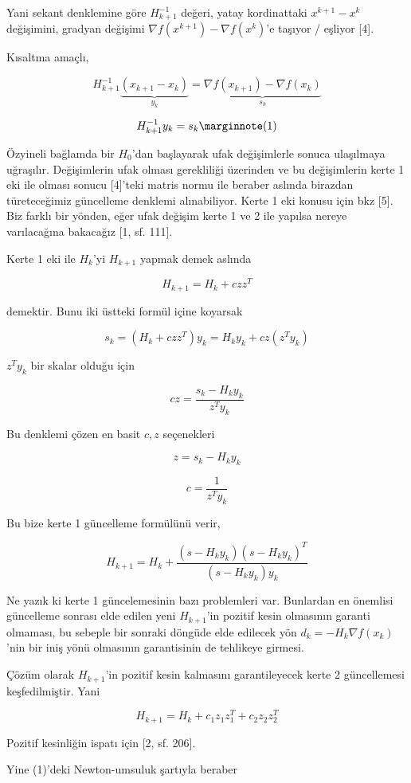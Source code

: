 \documentclass[12pt,fleqn]{article}\usepackage{../../common}
\begin{document}
Yani sekant denklemine göre $H_{k+1}^{-1}$ değeri, yatay kordinattaki
$x^{k+1}-x^k$ değişimini, gradyan değişimi $\nabla f(x^{k+1}) - \nabla
f(x^k)$'e taşıyor / eşliyor [4].

Kısaltma amaçlı,

$$
H_{k+1}^{-1} \underbrace{(x_{k+1}-x_k)}_{y_k} = 
\underbrace{\nabla f(x_{k+1}) - \nabla f(x_k)}_{s_k}
$$

$$
H_{k+1}^{-1} y_k = s_k
\mlabel{1}
$$

Özyineli bağlamda bir $H_0$'dan başlayarak ufak değişimlerle sonuca
ulaşılmaya uğraşılır. Değişimlerin ufak olması gerekliliği üzerinden ve bu
değişimlerin kerte 1 eki ile olması sonucu [4]'teki matris normu ile
beraber aslında birazdan türeteceğimiz güncelleme denklemi
alınabiliyor. Kerte 1 eki konusu için bkz [5]. Biz farklı bir yönden, eğer
ufak değişim kerte 1 ve 2 ile yapılsa nereye varılacağına bakacağız [1,
sf. 111].

Kerte 1 eki ile $H_k$'yi $H_{k+1}$ yapmak demek aslında

$$
H_{k+1} = H_k + czz^T 
$$

demektir. Bunu iki üstteki formül içine koyarsak

$$
s_k = (H_k + czz^T) y_k = H_k y_k + cz (z^T y_k)
$$

$z^T y_k$ bir skalar olduğu için 

$$
cz = \frac{s_k - H_k y_k}{z^T y_k}
$$

Bu denklemi çözen en basit $c,z$ seçenekleri

$$
z = s_k - H_ky_k
$$

$$
c = \frac{1}{z^Ty_k}
$$

Bu bize kerte 1 güncelleme formülünü verir,

$$
H_{k+1} = H_k + \frac{ (s-H_ky_k) (s-H_ky_k)^T }{(s-H_ky_k) y_k}
$$

Ne yazık ki kerte 1 güncelemesinin bazı problemleri var. Bunlardan en
önemlisi güncelleme sonrası elde edilen yeni $H_{k+1}$'in pozitif kesin
olmasının garanti olmaması, bu sebeple bir sonraki döngüde elde edilecek
yön $d_k = -H_k \nabla f(x_k)$'nin bir iniş yönü olmasının garantisinin de
tehlikeye girmesi. 

Çözüm olarak $H_{k+1}$'in pozitif kesin kalmasını garantileyecek kerte 2
güncellemesi keşfedilmiştir. Yani

$$
H_{k+1} = H_k + c_1z_1z_1^T + c_2z_2z_2^T 
$$

Pozitif kesinliğin ispatı için [2, sf. 206].

Yine (1)'deki Newton-umsuluk şartıyla beraber
\end{document}
